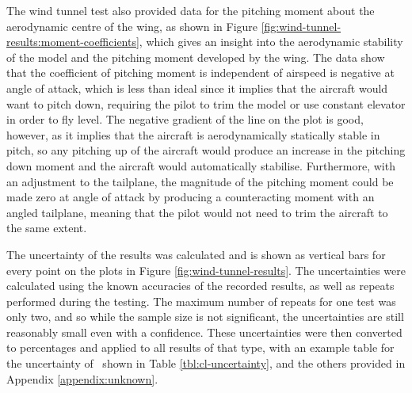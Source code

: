 \documentclass[../../main.tex]{subfiles}
\begin{document}
The wind tunnel test also provided data for the pitching moment about the aerodynamic centre of the wing, as shown in Figure \ref{fig:wind-tunnel-results:moment-coefficients}, which gives an insight into the aerodynamic stability of the model and the pitching moment developed by the wing.
The data show that the coefficient of pitching moment is independent of airspeed is negative at  angle of attack, which is less than ideal since it implies that the aircraft would want to pitch down, requiring the pilot to trim the model or use constant elevator in order to fly level.
The negative gradient of the line on the plot is good, however, as it implies that the aircraft is aerodynamically statically stable in pitch, so any pitching up of the aircraft would produce an increase in the pitching down moment and the aircraft would automatically stabilise.
Furthermore, with an adjustment to the tailplane, the magnitude of the pitching moment could be made zero at  angle of attack by producing a counteracting moment with an angled tailplane, meaning that the pilot would not need to trim the aircraft to the same extent. 

The uncertainty of the results was calculated and is shown as vertical bars for every point on the plots in Figure \ref{fig:wind-tunnel-results}.
The uncertainties were calculated using the known accuracies of the recorded results, as well as repeats performed during the testing.
The maximum number of repeats for one test was only two, and so while the sample size is not significant, the uncertainties are still reasonably small even with a  confidence.
These uncertainties were then converted to percentages and applied to all results of that type, with an example table for the uncertainty of \cl\, shown in Table \ref{tbl:cl-uncertainty}, and the others provided in Appendix \ref{appendix:unknown}.  %
\end{document}
